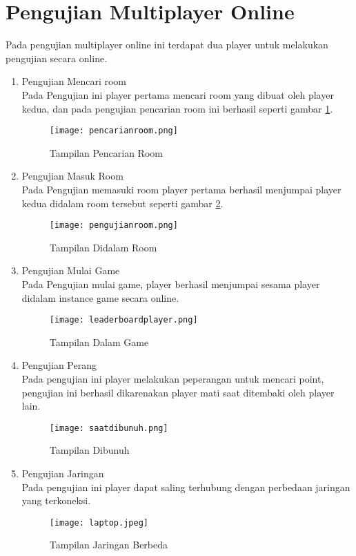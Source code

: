 \section{Pengujian Multiplayer Online}

Pada pengujian multiplayer online ini terdapat dua player untuk melakukan pengujian secara online.
\begin{enumerate}
    \item Pengujian Mencari room \\
    Pada Pengujian ini player pertama mencari room yang dibuat oleh player kedua, dan pada pengujian pencarian room ini berhasil seperti gambar \ref{fig:pencarianroom}. 
    \begin{figure}[h]
        \centering
        \texttt{[image: pencarianroom.png]}
        \caption{Tampilan Pencarian Room}
        \label{fig:pencarianroom}
    \end{figure}
    \item Pengujian Masuk Room \\
    Pada Pengujian memasuki room player pertama berhasil menjumpai player kedua didalam room tersebut seperti gambar \ref{fig:didalamroom}.
    \newpage
    \begin{figure}[h]
        \centering
        \texttt{[image: pengujianroom.png]}
        \caption{Tampilan Didalam Room}
        \label{fig:didalamroom}
    \end{figure}
    \item Pengujian Mulai Game \\
    Pada Pengujian mulai game, player berhasil menjumpai sesama player didalam instance game secara online.
    \begin{figure}[h]
        \centering
        \texttt{[image: leaderboardplayer.png]}
        \caption{Tampilan Dalam Game}
        \label{fig:dalamgame}
    \end{figure}
    \item Pengujian Perang \\
    Pada pengujian ini player melakukan peperangan untuk mencari point, pengujian ini berhasil dikarenakan player mati saat ditembaki oleh player lain.
    \newpage
    \begin{figure}[h]
        \centering
        \texttt{[image: saatdibunuh.png]}
        \caption{Tampilan Dibunuh}
        \label{fig:dibunuh}
    \end{figure}
    \item Pengujian Jaringan \\
    Pada pengujian ini player dapat saling terhubung dengan perbedaan jaringan yang terkoneksi.
    \begin{figure}[h]
        \centering
        \texttt{[image: laptop.jpeg]}
        \caption{Tampilan Jaringan Berbeda}
        \label{fig:jaringanberbeda}
    \end{figure}
\end{enumerate}


